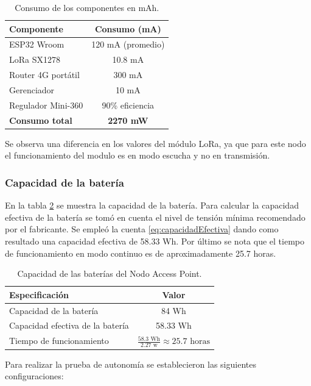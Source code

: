 \begin{table}[H]
    \centering

    \begin{tabular}{@{}lc@{}}
        \toprule
        \textbf{Componente}            & \textbf{Consumo (mA)} \\ \midrule
        ESP32 Wroom                   & 120 mA (promedio)      \\ 
        LoRa SX1278                   & 10.8 mA                  \\ 
        Router 4G portátil            & 300 mA                  \\ 
        Gerenciador                 & 10 mA                  \\ 
        Regulador Mini-360             & 90\% eficiencia                  \\ \midrule
        \textbf{Consumo total}        & \textbf{2270 mW}     \\ \bottomrule
    \end{tabular}
    \caption{Consumo de los componentes en mAh.}
    \label{tab:consumosAP}
\end{table}

Se observa una diferencia en los valores del módulo LoRa, ya que para este nodo el funcionamiento del modulo es en modo escucha y no en transmisión.

\subsubsection{Capacidad de la batería}
En la tabla \ref{tab:capacidadBat} se muestra la capacidad de la batería. Para calcular la capacidad efectiva de la batería se tomó en cuenta el nivel de tensión mínima recomendado por el fabricante. Se empleó la cuenta \ref{eq:capacidadEfectiva} dando como resultado una capacidad efectiva de 58.33 Wh.
Por último se nota que el tiempo de funcionamiento en modo continuo es de aproximadamente 25.7 horas.
\begin{table}[H]
    \centering
    \begin{tabular}{@{}lc@{}}
        \toprule
        \textbf{Especificación}       & \textbf{Valor}          \\ \midrule
        Capacidad de la batería       & 84 Wh       \\ 
        Capacidad efectiva de la batería       & 58.33 Wh      \\ 
        Tiempo de funcionamiento  & $\frac{58.3 \text{ Wh}}{2.27 \text{ w}} \approx 25.7 \text{ horas}$ \\ \bottomrule
    \end{tabular}
    \caption{Capacidad de las baterías del Nodo Access Point.}
    \label{tab:capacidadBat}
\end{table}
Para realizar la prueba de autonomía se establecieron las siguientes configuraciones:

